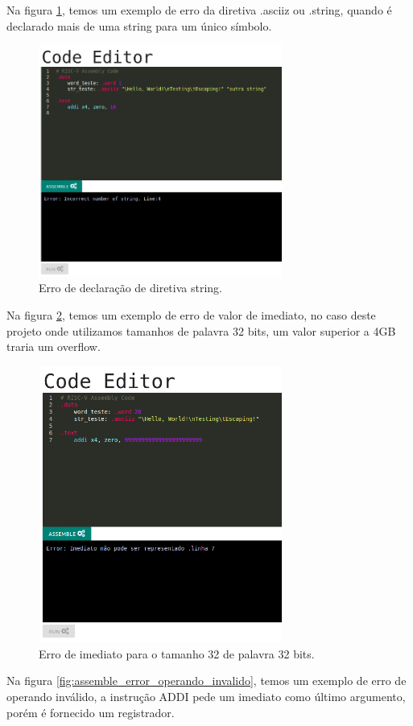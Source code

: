 	 Na figura \ref{fig:assemble_error_directives_strings}, temos um exemplo de erro da diretiva .asciiz ou .string, quando é declarado mais de uma string para um único símbolo.
	

	\begin{figure}[h!]
	  \centering	  
	  \includegraphics[width=8cm]{img/assemble_error_directives_strings.png}
	  \caption{Erro de declaração de diretiva string.}
	  \label{fig:assemble_error_directives_strings}
	\end{figure}


	 Na figura \ref{fig:assemble_error_imediato}, temos um exemplo de erro de valor de imediato, no caso deste projeto onde utilizamos tamanhos de palavra 32 bits, um valor superior a 4GB traria um overflow.
	
	\begin{figure}[h!]
	  \centering
	  \includegraphics[width=8cm]{img/assemble_error_imediato.png}
	  \caption{Erro de imediato para o tamanho 32 de palavra 32 bits.}
	  \label{fig:assemble_error_imediato}
	\end{figure}
	 Na figura \ref{fig:assemble_error_operando_invalido}, temos um exemplo de erro de operando inválido, a instrução ADDI pede um imediato como último argumento, porém é fornecido um registrador.
	
